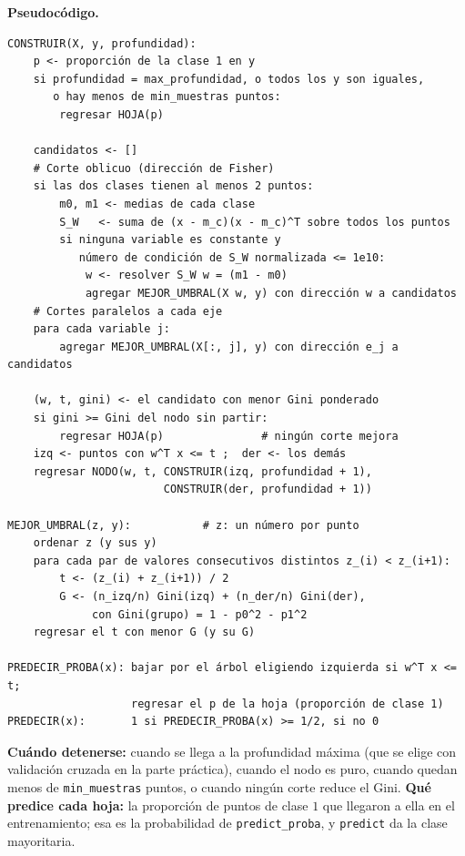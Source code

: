\documentclass[11pt, letterpaper]{article}
\begin{document}
\textbf{Pseudocódigo.}
\begin{verbatim}
CONSTRUIR(X, y, profundidad):
    p <- proporción de la clase 1 en y
    si profundidad = max_profundidad, o todos los y son iguales,
       o hay menos de min_muestras puntos:
        regresar HOJA(p)

    candidatos <- []
    # Corte oblicuo (dirección de Fisher)
    si las dos clases tienen al menos 2 puntos:
        m0, m1 <- medias de cada clase
        S_W   <- suma de (x - m_c)(x - m_c)^T sobre todos los puntos
        si ninguna variable es constante y
           número de condición de S_W normalizada <= 1e10:
            w <- resolver S_W w = (m1 - m0)
            agregar MEJOR_UMBRAL(X w, y) con dirección w a candidatos
    # Cortes paralelos a cada eje
    para cada variable j:
        agregar MEJOR_UMBRAL(X[:, j], y) con dirección e_j a candidatos

    (w, t, gini) <- el candidato con menor Gini ponderado
    si gini >= Gini del nodo sin partir:
        regresar HOJA(p)               # ningún corte mejora
    izq <- puntos con w^T x <= t ;  der <- los demás
    regresar NODO(w, t, CONSTRUIR(izq, profundidad + 1),
                        CONSTRUIR(der, profundidad + 1))

MEJOR_UMBRAL(z, y):           # z: un número por punto
    ordenar z (y sus y)
    para cada par de valores consecutivos distintos z_(i) < z_(i+1):
        t <- (z_(i) + z_(i+1)) / 2
        G <- (n_izq/n) Gini(izq) + (n_der/n) Gini(der),
             con Gini(grupo) = 1 - p0^2 - p1^2
    regresar el t con menor G (y su G)

PREDECIR_PROBA(x): bajar por el árbol eligiendo izquierda si w^T x <= t;
                   regresar el p de la hoja (proporción de clase 1)
PREDECIR(x):       1 si PREDECIR_PROBA(x) >= 1/2, si no 0
\end{verbatim}

\textbf{Cuándo detenerse:} cuando se llega a la profundidad máxima (que se elige con validación cruzada en la parte práctica), cuando el nodo es puro, cuando quedan menos de \texttt{min\_muestras} puntos, o cuando ningún corte reduce el Gini. \textbf{Qué predice cada hoja:} la proporción de puntos de clase $1$ que llegaron a ella en el entrenamiento; esa es la probabilidad de \texttt{predict\_proba}, y \texttt{predict} da la clase mayoritaria.

\end{document}
